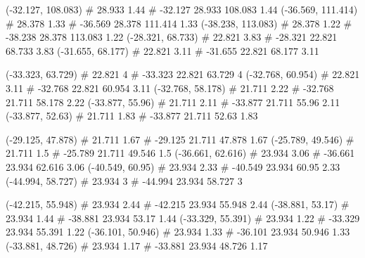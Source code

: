 \documentclass[a4paper,openbib,10pt]{article}
\newenvironment{treegraph}{\begin{graph}}{\end{graph}}
\begin{document}
\begin{treegraph}
  (-32.127, 108.083) #     28.933    1.44
   #    -32.127    28.933    108.083    1.44
  (-36.569, 111.414) #     28.378    1.33
   #    -36.569    28.378    111.414    1.33
  (-38.238, 113.083) #     28.378    1.22
   #    -38.238    28.378    113.083    1.22
  (-28.321, 68.733) #     22.821    3.83
   #    -28.321    22.821    68.733    3.83
  (-31.655, 68.177) #     22.821    3.11
   #    -31.655    22.821    68.177    3.11

  (-33.323, 63.729) #     22.821    4
   #    -33.323    22.821    63.729    4
  (-32.768, 60.954) #     22.821    3.11
   #    -32.768    22.821    60.954    3.11
  (-32.768, 58.178) #     21.711    2.22
   #    -32.768    21.711    58.178    2.22
  (-33.877, 55.96) #     21.711    2.11
   #    -33.877    21.711    55.96    2.11
  (-33.877, 52.63) #     21.711    1.83
   #    -33.877    21.711    52.63    1.83

  (-29.125, 47.878) #     21.711    1.67
   #    -29.125    21.711    47.878    1.67
  (-25.789, 49.546) #     21.711    1.5
   #    -25.789    21.711    49.546    1.5
  (-36.661, 62.616) #     23.934    3.06
   #    -36.661    23.934    62.616    3.06
  (-40.549, 60.95) #     23.934    2.33
   #    -40.549    23.934    60.95    2.33
  (-44.994, 58.727) #     23.934    3
   #    -44.994    23.934    58.727    3

  (-42.215, 55.948) #     23.934    2.44
   #    -42.215    23.934    55.948    2.44
  (-38.881, 53.17) #     23.934    1.44
   #    -38.881    23.934    53.17    1.44
  (-33.329, 55.391) #     23.934    1.22
   #    -33.329    23.934    55.391    1.22
  (-36.101, 50.946) #     23.934    1.33
   #    -36.101    23.934    50.946    1.33
  (-33.881, 48.726) #     23.934    1.17
   #    -33.881    23.934    48.726    1.17


\end{treegraph}
\end{document}
